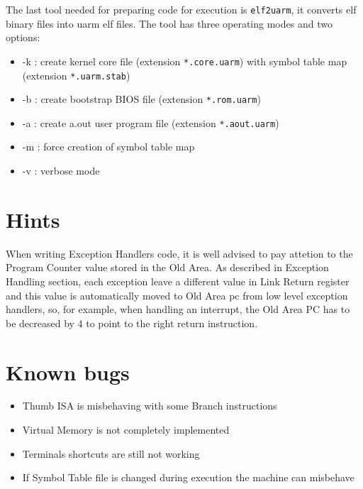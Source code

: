 The last tool needed for preparing code for execution is \texttt{elf2uarm}, it converts elf binary files into uarm elf files. The tool has three operating modes and two options:

\begin{itemize}
\item -k : create kernel core file (extension \texttt{*.core.uarm}) with symbol table map (extension \texttt{*.uarm.stab})
\item -b : create bootstrap BIOS file (extension \texttt{*.rom.uarm})
\item -a : create a.out user program file (extension \texttt{*.aout.uarm})
\\
\item -m : force creation of symbol table map
\item -v : verbose mode
\end{itemize}

\section{Hints}

When writing Exception Handlers code, it is well advised to pay attetion to the Program Counter value stored in the Old Area. As described in Exception Handling section, each exception leave a different value in Link Return register and this value is automatically moved to Old Area pc from low level exception handlers, so, for example, when handling an interrupt, the Old Area PC has to be decreased by 4 to point to the right return instruction.

\section{Known bugs}

\begin{itemize}
\item Thumb ISA is misbehaving with some Branch instructions
\item Virtual Memory is not completely implemented
\item Terminals shortcuts are still not working
\item If Symbol Table file is changed during execution the machine can misbehave

\end{itemize}
